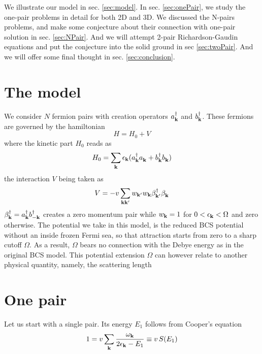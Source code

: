 \documentclass[3p,twocolumn]{elsarticle}
\begin{document}
We illustrate our model in sec. \ref{sec:model}.  In sec. \ref{sec:onePair}, we study the one-pair problems in detail for both 2D and 3D.  We discussed the N-pairs problems, and make some conjecture about their connection with one-pair solution  in sec. \ref{sec:NPair}.  And we will attempt 2-pair Richardson-Gaudin equations and put the conjecture into the solid ground in sec \ref{sec:twoPair}.  And we will offer some final thought in sec. \ref{sec:conclusion}.
\section{The model\label{sec:model}}
We consider $N$ fermion pairs with creation operators $a_{\mathbf{k}}^\dagger$ and $b_{\mathbf{k}}^\dagger$.  These fermions are  governed by the hamiltonian
\begin{equation}
H=H_{0}+V
\end{equation}
where  the kinetic part $H_0$ reads as 
\begin{equation}
H_0=\sum_{\mathbf{k}}\epsilon_{\mathbf{k}}(a^\dagger_{\mathbf{k}}{}a^{}_{\mathbf{k}}+b^\dagger_{\mathbf{k}}{}b^{}_{\mathbf{k}})
\label{eq:}
\end{equation}
the interaction $V$ being taken as 
\begin{equation}
V=-v\sum_{\mathbf{k}\mathbf{k}'}w_{\mathbf{k}'}w_{\mathbf{k}}\beta^\dagger_{\mathbf{k}'}{}\beta^{}_{\mathbf{k}}
\label{eq:VBcs}
\end{equation}
 $\beta^\dagger_{\mathbf{k}}=a^\dagger_{\mathbf{k}}b^\dagger_{-\mathbf{k}}$ creates a zero momentum pair while $w_{\mathbf{k}}=1$ for $0<\epsilon_{\mathbf{k}}<\Omega$ and zero otherwise.  The potential we take in this model, is the reduced BCS  potential without an inside frozen Fermi sea, so that attraction starts from zero to a sharp cutoff $\Omega$.  As a result,  $\Omega$ bears no connection with the Debye energy as in the original BCS model. This potential extension $\Omega$ can however relate to another physical quantity, namely, the scattering length %
\section{One pair\label{sec:onePair}}
Let us start with a single pair. Its energy $E_1$ follows from Cooper's equation
\begin{equation}
1=v\sum_{\mathbf{k}}\frac{\omega_{\mathbf{k}}}{2\epsilon_{\mathbf{k}}-E_1}\equiv{}v\,S(E_1)
\label{eq:onePair}
\end{equation}
\end{document}
